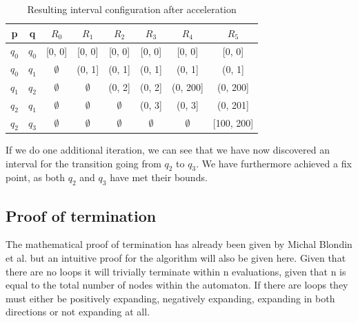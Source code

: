 \documentclass[12pt]{thesis}
\begin{document}
\begin{table}[t!]
	\begin{tabular}{ |c|c|c|c|c|c|c|c| }
		\hline
		p		& q 	& $R_0$ 		& $R_1$			& $R_2$			& $R_3$			& $R_4$ 		& $R_5$ \\
		\hline
		$q_0$	& $q_0$ & [0, 0] 		& [0, 0] 		& [0, 0] 		& [0, 0]		& [0, 0]		& [0, 0] \\
		$q_0$	& $q_1$ & $\emptyset$ 	& (0, 1]		& (0, 1] 		& (0, 1]		& (0, 1] 		& (0, 1] \\
		$q_1$	& $q_2$ & $\emptyset$ 	& $\emptyset$ 	& (0, 2] 		& (0, 2]		& (0, 200] 		& (0, 200] \\
		$q_2$	& $q_1$ & $\emptyset$ 	& $\emptyset$ 	& $\emptyset$	& (0, 3]		& (0, 3] 		& (0, 201] \\
		$q_2$	& $q_3$ & $\emptyset$ 	& $\emptyset$ 	& $\emptyset$	& $\emptyset$	& $\emptyset$	& [100, 200] \\
		\hline
	\end{tabular}
	\centering
	\caption{Resulting interval configuration after acceleration}
	\label{table:table_example_acc}
\end{table}

If we do one additional iteration, we can see that we have now discovered an interval for the transition going from $q_2$ to $q_3$. We have furthermore achieved a fix point, as both $q_2$ and $q_3$ have met their bounds.

\subsection{Proof of termination}
The mathematical proof of termination has already been given by Michal Blondin et al. \cite{blondin2021continuous} but an intuitive proof for the algorithm will also be given here. Given that there are no loops it will trivially terminate within n evaluations, given that n is equal to the total number of nodes within the automaton. If there are loops they must either be positively expanding, negatively expanding, expanding in both directions or not expanding at all. 
\end{document}
